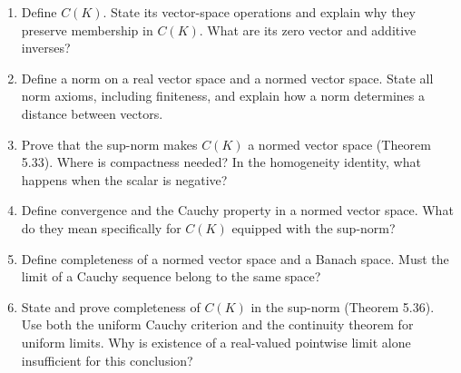\begin{enumerate}[resume]
  \item Define \(C(K)\). State its vector-space operations and
    explain why they preserve membership in \(C(K)\).
    What are its zero vector and additive inverses?

  \item Define a norm on a real vector space and a normed vector
    space. State all norm axioms, including finiteness, and explain
    how a norm determines a distance between vectors.

  \item Prove that the sup-norm makes \(C(K)\) a normed vector
    space (Theorem 5.33). Where is compactness needed?
    In the homogeneity identity, what happens when the scalar is negative?

  \item Define convergence and the Cauchy property in a normed
    vector space. What do they mean specifically for \(C(K)\)
    equipped with the sup-norm?

  \item Define completeness of a normed vector space and a Banach
    space. Must the limit of a Cauchy sequence belong to the same space?

  \item State and prove completeness of \(C(K)\) in the sup-norm
    (Theorem 5.36). Use both the uniform Cauchy criterion and the
    continuity theorem for uniform limits. Why is existence of a
    real-valued pointwise limit alone insufficient for this conclusion?
\end{enumerate}
